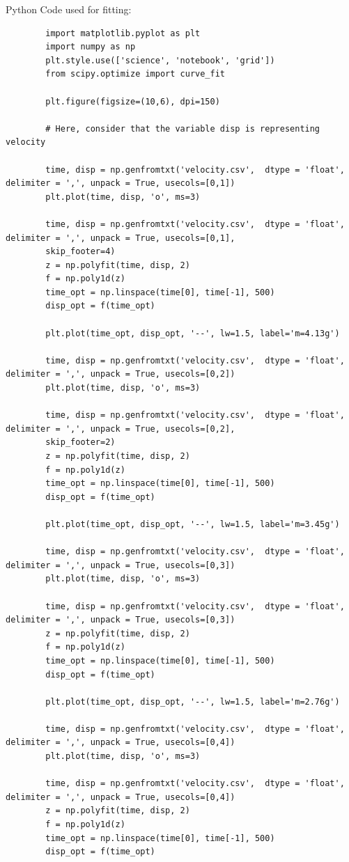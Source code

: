 \documentclass{article}
\begin{document}
 	Python Code used for fitting:
 	
 	\begin{lstlisting}
 		import matplotlib.pyplot as plt
 		import numpy as np
 		plt.style.use(['science', 'notebook', 'grid'])
 		from scipy.optimize import curve_fit
 		
 		plt.figure(figsize=(10,6), dpi=150)
 		
 		# Here, consider that the variable disp is representing velocity
 		
 		time, disp = np.genfromtxt('velocity.csv',  dtype = 'float', delimiter = ',', unpack = True, usecols=[0,1])
 		plt.plot(time, disp, 'o', ms=3)
 		
 		time, disp = np.genfromtxt('velocity.csv',  dtype = 'float', delimiter = ',', unpack = True, usecols=[0,1],
 		skip_footer=4)
 		z = np.polyfit(time, disp, 2)
 		f = np.poly1d(z)
 		time_opt = np.linspace(time[0], time[-1], 500)
 		disp_opt = f(time_opt)
 		
 		plt.plot(time_opt, disp_opt, '--', lw=1.5, label='m=4.13g')
 		
 		time, disp = np.genfromtxt('velocity.csv',  dtype = 'float', delimiter = ',', unpack = True, usecols=[0,2])
 		plt.plot(time, disp, 'o', ms=3)
 		
 		time, disp = np.genfromtxt('velocity.csv',  dtype = 'float', delimiter = ',', unpack = True, usecols=[0,2],
 		skip_footer=2)
 		z = np.polyfit(time, disp, 2)
 		f = np.poly1d(z)
 		time_opt = np.linspace(time[0], time[-1], 500)
 		disp_opt = f(time_opt)
 		
 		plt.plot(time_opt, disp_opt, '--', lw=1.5, label='m=3.45g')
 		
 		time, disp = np.genfromtxt('velocity.csv',  dtype = 'float', delimiter = ',', unpack = True, usecols=[0,3])
 		plt.plot(time, disp, 'o', ms=3)
 		
 		time, disp = np.genfromtxt('velocity.csv',  dtype = 'float', delimiter = ',', unpack = True, usecols=[0,3])
 		z = np.polyfit(time, disp, 2)
 		f = np.poly1d(z)
 		time_opt = np.linspace(time[0], time[-1], 500)
 		disp_opt = f(time_opt)
 		
 		plt.plot(time_opt, disp_opt, '--', lw=1.5, label='m=2.76g')
 		
 		time, disp = np.genfromtxt('velocity.csv',  dtype = 'float', delimiter = ',', unpack = True, usecols=[0,4])
 		plt.plot(time, disp, 'o', ms=3)
 		
 		time, disp = np.genfromtxt('velocity.csv',  dtype = 'float', delimiter = ',', unpack = True, usecols=[0,4])
 		z = np.polyfit(time, disp, 2)
 		f = np.poly1d(z)
 		time_opt = np.linspace(time[0], time[-1], 500)
 		disp_opt = f(time_opt)
 		

\end{lstlisting}
\end{document}
